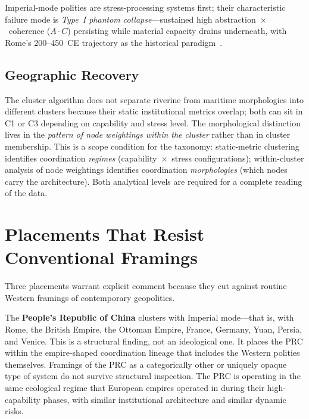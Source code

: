 \documentclass[12pt,a4paper]{article}
\begin{document}
Imperial-mode polities are stress-processing systems first; their characteristic failure mode is \textit{Type~I phantom collapse}---sustained high abstraction~$\times$~coherence ($A \cdot C$) persisting while material capacity drains underneath, with Rome's 200--450~CE trajectory as the historical paradigm~\cite{mckern2026esch,mckern2026v32r}.

\subsection{Geographic Recovery}

The cluster algorithm does not separate riverine from maritime morphologies into different clusters because their static institutional metrics overlap; both can sit in C1 or C3 depending on capability and stress level. The morphological distinction lives in the \textit{pattern of node weightings within the cluster} rather than in cluster membership. This is a scope condition for the taxonomy: static-metric clustering identifies coordination \textit{regimes} (capability~$\times$~stress configurations); within-cluster analysis of node weightings identifies coordination \textit{morphologies} (which nodes carry the architecture). Both analytical levels are required for a complete reading of the data.

\section{Placements That Resist Conventional Framings}

Three placements warrant explicit comment because they cut against routine Western framings of contemporary geopolitics.

The \textbf{People's Republic of China} clusters with Imperial mode---that is, with Rome, the British Empire, the Ottoman Empire, France, Germany, Yuan, Persia, and Venice. This is a structural finding, not an ideological one. It places the PRC within the empire-shaped coordination lineage that includes the Western polities themselves. Framings of the PRC as a categorically other or uniquely opaque type of system do not survive structural inspection. The PRC is operating in the same ecological regime that European empires operated in during their high-capability phases, with similar institutional architecture and similar dynamic risks.
\end{document}
